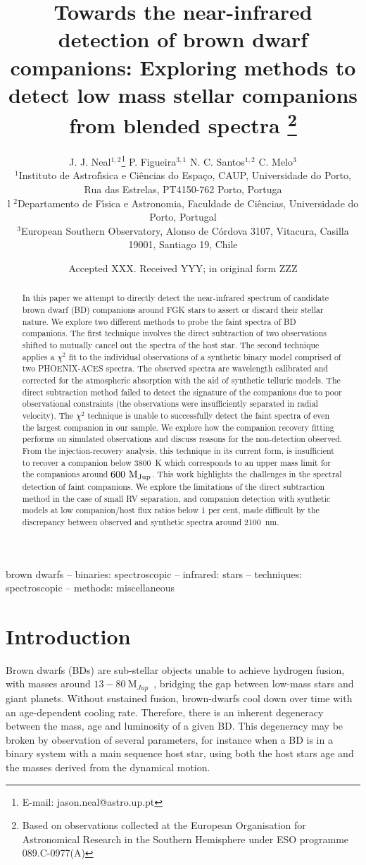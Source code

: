 \documentclass[fleqn,usenatbib]{mnras}
\title[Towards the nIR detection of BD companions]{Towards the near-infrared detection of brown dwarf companions: Exploring methods to detect low mass stellar companions from blended spectra \thanks{Based on observations collected at the European Organisation for Astronomical Research in the Southern Hemisphere under ESO programme 089.C-0977(A)}}
\author[J. J. Neal et al.]{
J. J. Neal$^{1,2}$\thanks{E-mail: jason.neal@astro.up.pt}
P. Figueira$^{3,1}$
N. C. Santos$^{1,2}$
C. Melo$^{3}$
\\
$^{1}$Instituto de Astrof\'{\i}sica e Ci\^encias do Espa\c{c}o, CAUP, Universidade do Porto, Rua das Estrelas, PT4150-762 Porto, Portuga\\l
$^{2}$Departamento de F\'{\i}sica e Astronomia, Faculdade de Ci\^{e}ncias, Universidade do Porto, Portugal\\
$^{3}$European Southern Observatory, Alonso de C\'{o}rdova 3107, Vitacura, Casilla 19001, Santiago 19, Chile\\
}
\date{Accepted XXX. Received YYY; in original form ZZZ}
\begin{document}
\label{firstpage}
\pagerange{\pageref{firstpage}--\pageref{lastpage}}
\maketitle

\begin{abstract}
   {In this paper we attempt to directly detect the near-infrared spectrum of candidate brown dwarf (BD) companions around FGK stars to assert or discard their stellar nature. We explore two different methods to probe the faint spectra of BD companions. The first technique involves the direct subtraction of two observations shifted to mutually cancel out the spectra of the host star. The second technique applies a \(\chi^{2}\) fit to the individual observations of a synthetic binary model comprised of two PHOENIX-ACES spectra. The observed spectra are wavelength calibrated and corrected for the atmospheric absorption with the aid of synthetic telluric models. The direct subtraction method failed to detect the signature of the companions due to poor observational constraints (the observations were insufficiently separated in radial velocity). The \(\chi^{2}\) technique is unable to successfully detect the faint spectra of even the largest companion in our sample. We explore how the companion recovery fitting performs on simulated observations and discuss reasons for the non-detection observed. From the injection-recovery analysis, this technique in its current form, is insufficient to recover a companion below 3800~K which corresponds to an upper mass limit for the companions around \(\rm 600~M_{Jup}\). This work highlights the challenges in the spectral detection of faint companions. We explore the limitations of the direct subtraction method in the case of small RV separation, and companion detection with synthetic models at low companion/host flux ratios below 1 per cent, made difficult by the discrepancy between observed and synthetic spectra around 2100~nm.}
\end{abstract}

\begin{keywords}
brown dwarfs -- binaries: spectroscopic -- infrared: stars -- techniques: spectroscopic -- methods: miscellaneous
\end{keywords}


\section{Introduction}
\label{sec:intro}
Brown dwarfs (BDs) are sub-stellar objects unable to achieve hydrogen fusion, with masses around \(13-80~\textrm{M}_{Jup}\)~\citep{chabrier_theory_2000}, bridging the gap between low-mass stars and giant planets. Without sustained fusion, brown-dwarfs cool down over time with an age-dependent cooling rate. Therefore, there is an inherent degeneracy between the mass, age and luminosity of a given BD\citep{burrows_nongray_1997}. This degeneracy may be broken by observation of several parameters, for instance when a BD is in a binary system with a main sequence host star, using both the host stars age and the masses derived from the dynamical motion.
\end{document}
